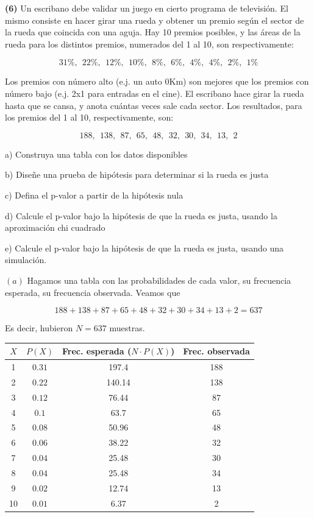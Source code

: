 \documentclass[a4paper, 12pt]{article}
\begin{document}
\pagebreak 

\begin{myframe}
    \textbf{(6)} Un escribano debe validar un juego en cierto programa de
    televisión. El mismo consiste en hacer girar una rueda y obtener un premio
    según el sector de la rueda que coincida con una aguja. Hay 10 premios
    posibles, y las áreas de la rueda para los distintos premios, numerados del
    1 al 10, son respectivamente:

    $$31\%,~~ 22\%,~~ 12\%,~~ 10\%,~~ 8\%,~~ 6\%,~~ 4\%,~~ 4\%,~~ 2\%,~~ 1\%$$

    Los premios con número alto (e.j. un auto 0Km) son mejores que los premios
    con número bajo (e.j. 2x1 para entradas en el cine). El escribano hace girar
    la rueda hasta que se cansa, y anota cuántas veces sale cada sector. Los
    resultados, para los premios del 1 al 10, respectivamente, son: 

    $$188,~~ 138,~~ 87,~~ 65,~~ 48,~~ 32,~~ 30,~~ 34,~~ 13,~~ 2$$
    
    a) Construya una tabla con los datos disponibles

    b) Diseñe una prueba de hipótesis para determinar si la rueda es justa

    c) Defina el p-valor a partir de la hipótesis nula

    d) Calcule el p-valor bajo la hipótesis de que la rueda es justa, usando la aproximación chi cuadrado

    e) Calcule el p-valor bajo la hipótesis de que la rueda es justa, usando una simulación.
\end{myframe}

$(a)$ Hagamos una tabla con las probabilidades de cada valor, su frecuencia
esperada, su frecuencia observada. Veamos que

\begin{equation*}
    188+ 138+ 87+ 65+ 48+ 32+ 30+ 34+ 13+ 2 = 637
\end{equation*}

Es decir, hubieron $N = 637$ muestras.

\begin{table}[h!]
\centering
\begin{tabular}{|c|c|c|c|}
\hline
$X$ & $P(X)$ & \textbf{Frec. esperada} ($N \cdot P(X)$) & \textbf{Frec.
observada} \\
\hline
1 &$0.31$  &197.4 & 188 \\
2 &$0.22$ &140.14 & 138 \\
3 &$0.12$ &76.44 & 87 \\
4 &$0.1$ &63.7 & 65 \\
5 &$0.08$ &50.96 & 48 \\
6 &$0.06$ &38.22 & 32 \\
7 &$0.04$ &25.48 & 30 \\
8 &$0.04$ &25.48 & 34 \\
9 &$0.02$ &12.74 & 13 \\
10 &$0.01$& 6.37 & 2 \\
\hline
\end{tabular}
\label{tab:freq-table}
\end{table}
\end{document}
